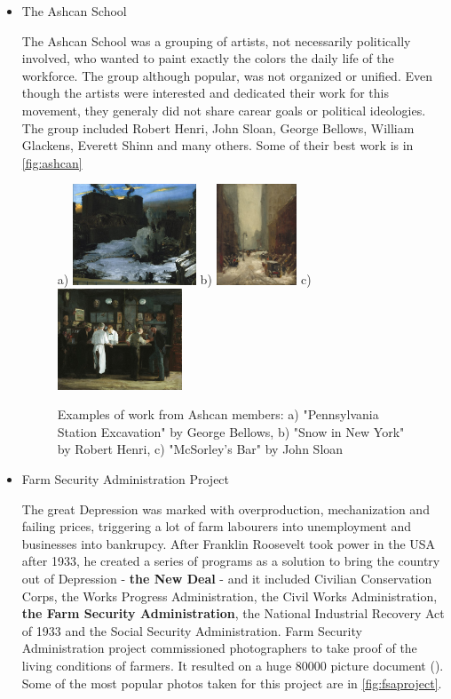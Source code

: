 \documentclass{report}
\begin{document}
\begin{itemize}

	\item{The Ashcan School}

The Ashcan School was a grouping of artists, not necessarily politically involved, who wanted to paint exactly the colors the daily life of the workforce. The group although popular, was not organized or unified. Even though the artists were interested and dedicated their work for this movement, they generaly did not share carear goals or political ideologies. The group included Robert Henri, John Sloan, George Bellows, William Glackens, Everett Shinn and many others. Some of their best work is in \autoref{fig:ashcan}


\begin{figure}[h]
\center
a) \includegraphics[height=3cm]{img/exca}
b) \includegraphics[height=3cm]{img/snow}
c) \includegraphics[height=3cm]{img/bar}
\caption{Examples of work from Ashcan members: a) "Pennsylvania Station Excavation" by George Bellows,
b) "Snow in New York" by Robert Henri, c) "McSorley's Bar" by John Sloan}
\label{fig:ashcan}
\end{figure}

	\item{Farm Security Administration Project}
	
The great Depression was marked with overproduction, mechanization and failing prices, triggering a lot of farm labourers into unemployment and businesses into bankrupcy.
After Franklin Roosevelt took power in the USA after 1933, he created a series of programs as a solution to bring the country out of Depression - \textbf{the New Deal} - and it included Civilian Conservation Corps, the Works Progress Administration, the Civil Works Administration, \textbf{the Farm Security Administration}, the National Industrial Recovery Act of 1933 and the Social Security Administration.
Farm Security Administration project commissioned photographers to take proof of the living conditions of farmers. It resulted on a huge 80000 picture document (\cite{WEBSITE:2}). Some of the most popular photos taken for this project are in \autoref{fig:fsaproject}.



\end{itemize}
\end{document}
